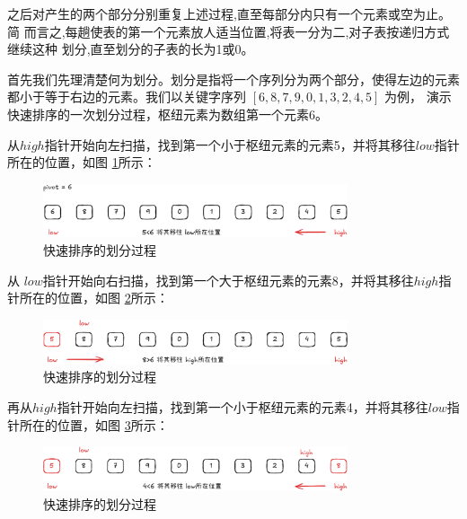 \documentclass[lang=cn,newtx,10pt,scheme=chinese]{elegantbook}
\begin{document}
之后对产生的两个部分分别重复上述过程,直至每部分内只有一个元素或空为止。简
而言之,每趟使表的第一个元素放人适当位置,将表一分为二,对子表按递归方式继续这种
划分,直至划分的子表的长为1或0。

首先我们先理清楚何为划分。划分是指将一个序列分为两个部分，使得左边的元素都小于等于右边的元素。我们以关键字序列 $[6,8,7,9,0,1,3,2,4,5]$ 为例，
演示快速排序的一次划分过程，枢纽元素为数组第一个元素6。

从$high$指针开始向左扫描，找到第一个小于枢纽元素的元素5，并将其移往$low$指针所在的位置，如图 \ref{fig:patition_a}所示：

\begin{figure}[h!]
    \centering
    \includegraphics[width=0.8\textwidth]{./figure/pdf/cropped/patition_a.pdf}
    \caption{快速排序的划分过程}
    \label{fig:patition_a}

\end{figure}

从 $low$指针开始向右扫描，找到第一个大于枢纽元素的元素8，并将其移往$high$指针所在的位置，如图 \ref{fig:patition_b}所示：

\begin{figure}[h!]
    \centering
    \includegraphics[width=0.8\textwidth]{./figure/pdf/cropped/patition_b.pdf}
    \caption{快速排序的划分过程}
    \label{fig:patition_b}

    \end{figure}

再从$high$指针开始向左扫描，找到第一个小于枢纽元素的元素4，并将其移往$low$指针所在的位置，如图 \ref{fig:patition_c}所示：

\begin{figure}[h!]
    \centering
    \includegraphics[width=0.8\textwidth]{./figure/pdf/cropped/patition_c.pdf}
    \caption{快速排序的划分过程}
    \label{fig:patition_c}
\end{figure}
\end{document}
